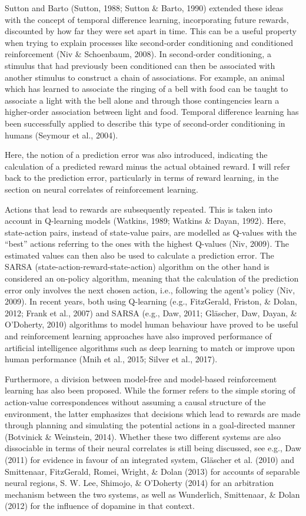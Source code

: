 \documentclass[12pt,openany]{book}
\theoremstyle{definition}
\theoremstyle{definition}
\theoremstyle{definition}
\theoremstyle{remark}
\begin{document}
Sutton and Barto (Sutton, 1988; Sutton \& Barto, 1990) extended these
ideas with the concept of temporal difference learning, incorporating
future rewards, discounted by how far they were set apart in time. This
can be a useful property when trying to explain processes like
second-order conditioning and conditioned reinforcement (Niv \&
Schoenbaum, 2008). In second-order conditioning, a stimulus that had
previously been conditioned can then be associated with another stimulus
to construct a chain of associations. For example, an animal which has
learned to associate the ringing of a bell with food can be taught to
associate a light with the bell alone and through those contingencies
learn a higher-order association between light and food. Temporal
difference learning has been successfully applied to describe this type
of second-order conditioning in humans (Seymour et al., 2004).

Here, the notion of a prediction error was also introduced, indicating
the calculation of a predicted reward minus the actual obtained reward.
I will refer back to the prediction error, particularly in terms of
reward learning, in the section on neural correlates of reinforcement
learning.

Actions that lead to rewards are subsequently repeated. This is taken
into account in Q-learning models (Watkins, 1989; Watkins \& Dayan,
1992). Here, state-action pairs, instead of state-value pairs, are
modelled as Q-values with the ``best'' actions referring to the ones
with the highest Q-values (Niv, 2009). The estimated values can then
also be used to calculate a prediction error. The SARSA
(state-action-reward-state-action) algorithm on the other hand is
considered an on-policy algorithm, meaning that the calculation of the
prediction error only involves the next chosen action, i.e., following
the agent's policy (Niv, 2009). In recent years, both using Q-learning
(e.g., FitzGerald, Friston, \& Dolan, 2012; Frank et al., 2007) and
SARSA (e.g., Daw, 2011; Gläscher, Daw, Dayan, \& O'Doherty, 2010)
algorithms to model human behaviour have proved to be useful and
reinforcement learning approaches have also improved performance of
artificial intelligence algorithms such as deep learning to match or
improve upon human performance (Mnih et al., 2015; Silver et al., 2017).

Furthermore, a division between model-free and model-based reinforcement
learning has also been proposed. While the former refers to the simple
storing of action-value correspondences without assuming a causal
structure of the environment, the latter emphasizes that decisions which
lead to rewards are made through planning and simulating the potential
actions in a goal-directed manner (Botvinick \& Weinstein, 2014).
Whether these two different systems are also dissociable in terms of
their neural correlates is still being discussed, see e.g., Daw (2011)
for evidence in favour of an integrated system, Gläscher et al. (2010)
and Smittenaar, FitzGerald, Romei, Wright, \& Dolan (2013) for accounts
of separable neural regions, S. W. Lee, Shimojo, \& O'Doherty (2014) for
an arbitration mechanism between the two systems, as well as Wunderlich,
Smittenaar, \& Dolan (2012) for the influence of dopamine in that
context.
\end{document}
